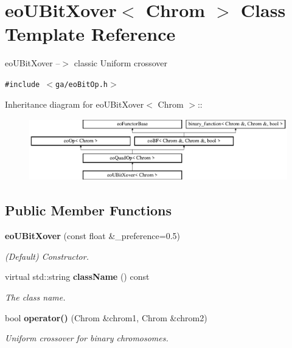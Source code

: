 \section{eo\-UBit\-Xover$<$ Chrom $>$ Class Template Reference}
\label{classeo_u_bit_xover}
eo\-UBit\-Xover --$>$ classic Uniform crossover  


{\tt \#include $<$ga/eo\-Bit\-Op.h$>$}

Inheritance diagram for eo\-UBit\-Xover$<$ Chrom $>$::\begin{figure}[H]
\begin{center}
\leavevmode
\includegraphics[height=2.70531cm]{classeo_u_bit_xover}
\end{center}
\end{figure}
\subsection*{Public Member Functions}
\begin{CompactItemize}
\item 
{\bf eo\-UBit\-Xover} (const float \&\_\-preference=0.5)\label{classeo_u_bit_xover_a0}

\begin{CompactList}\small\item\em (Default) Constructor. \item\end{CompactList}\item 
virtual std::string {\bf class\-Name} () const \label{classeo_u_bit_xover_a1}

\begin{CompactList}\small\item\em The class name. \item\end{CompactList}\item 
bool {\bf operator()} (Chrom \&chrom1, Chrom \&chrom2)
\begin{CompactList}\small\item\em Uniform crossover for binary chromosomes. \item\end{CompactList}\end{CompactItemize}
